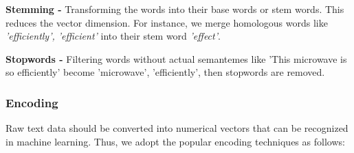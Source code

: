 \documentclass[12pt]{article}%
\begin{document}
	\textbf{Stemming -} Transforming the words into their base words or stem words. This reduces the vector dimension. For instance, we merge homologous words like \textit{'efficiently', 'efficient'}  into their stem word \textit{'effect'}.
	
	\textbf{Stopwords -} Filtering words without actual semantemes like 'This microwave is so efficiently' become 'microwave', 'efficiently', then stopwords are removed.


\subsubsection{Encoding}

Raw text data should be converted into numerical vectors that can be recognized in machine learning. Thus, we adopt the popular encoding techniques as follows:
\end{document}

